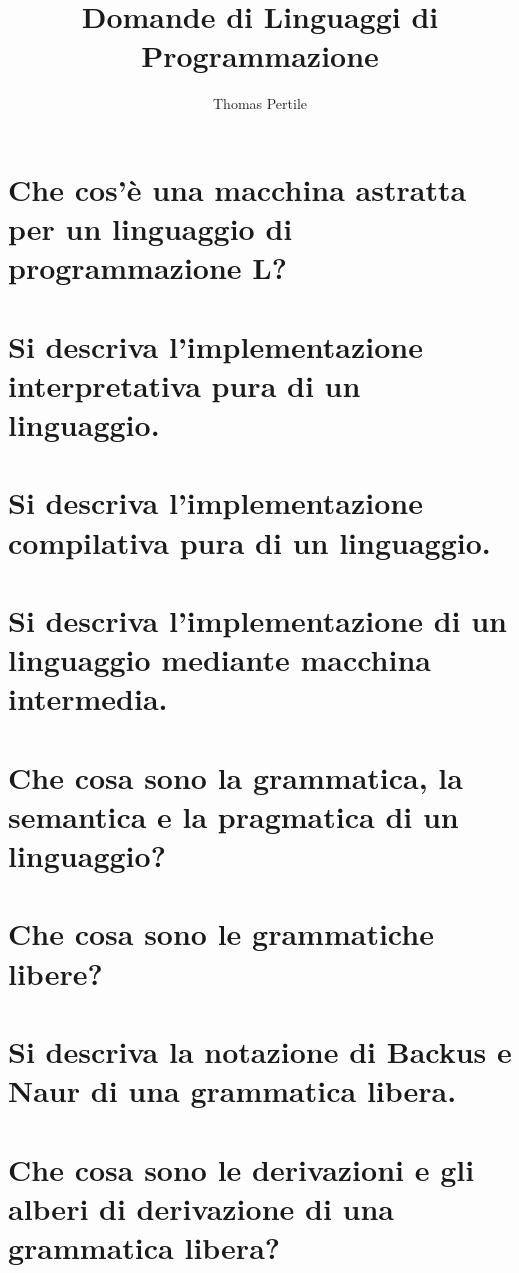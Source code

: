 \documentclass[a4paper, 10pt, italian]{article} %
\author{Thomas Pertile} %
\title{Domande di Linguaggi di Programmazione} %
\begin{document}
\maketitle %

\section{Che cos’\`{e} una macchina astratta per un linguaggio di programmazione L?} %

\section{Si descriva l’implementazione interpretativa pura di un linguaggio.}

\section{Si descriva l’implementazione compilativa pura di un linguaggio.}

\section{Si descriva l’implementazione di un linguaggio mediante macchina intermedia.}

\section{Che cosa sono la grammatica, la semantica e la pragmatica di un linguaggio?}

\section{Che cosa sono le grammatiche libere?}

\section{Si descriva la notazione di Backus e Naur di una grammatica libera.}

\section{Che cosa sono le derivazioni e gli alberi di derivazione di una grammatica libera?}
\end{document}
